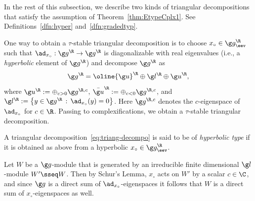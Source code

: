 \documentclass[12pt]{amsart}
\begin{document}
 
In the rest of this subsection, we describe two kinds of triangular decompositions that satisfy the assumption of Theorem~\ref{thm:EtypeCplx1}. See Definitions~\ref{dfn:hyper} and~\ref{dfn:gradedtyp}. 

One way to obtain a $\tau$-stable triangular decomposition is to choose  $x_\circ\in\g g^\R_\eev$ such that $\ad_{x_\circ}:\g g^\R\to\g g^\R$ is diagonalizable with real eigenvalues (i.e., a \emph{hyperbolic} element of $\g g^\R$) and decompose $\g g^\R$ as 
\begin{equation}
\label{eq:gR=}
\g g^\R=
\oline{\g u}^{\R}\oplus\g l^\R\oplus{\g  u}^{\R},
\end{equation} 
where $\g u^\R:=\oplus_{c>0}\g g^{\R,c}$,
$\bar{\g u}^\R:=\oplus_{c<0}\g g^{\R,c}$,
and $\g l^\R:=\left\{y\in\g g^\R\,:\,\ad_{x_\circ}(y)=0\right\}$.
Here $\g g^{\R,c}$ denotes the $c$-eigenspace of $\ad_{x_\circ}$ for $c\in\R$. Passing to complexifications, we obtain a $\tau$-stable triangular decomposition. 
\begin{dfn}
\label{dfn:hyper}
A triangular decomposition~\eqref{eq:triang-decompo} is said to be of  \emph{hyperbolic type} if it is  obtained as above from a hyperbolic $x_\circ\in\g g^\R_\eev$.  
\end{dfn}


\begin{rmk}
\label{rmk:eigx0}
Let $W$ be a $\g g$-module that is generated by an irreducible finite dimensional $\g l$-module $W'\sseq W$. Then by Schur's Lemma, 
 $x_\circ$ acts on $W'$ by a scalar $c\in\C$, and since $\g g$ is a direct sum of $\ad_{x_\circ}$-eigenspaces it follows that $W$ is a  direct sum of $x_\circ$-eigenspaces as well.
\end{rmk}
\end{document}
